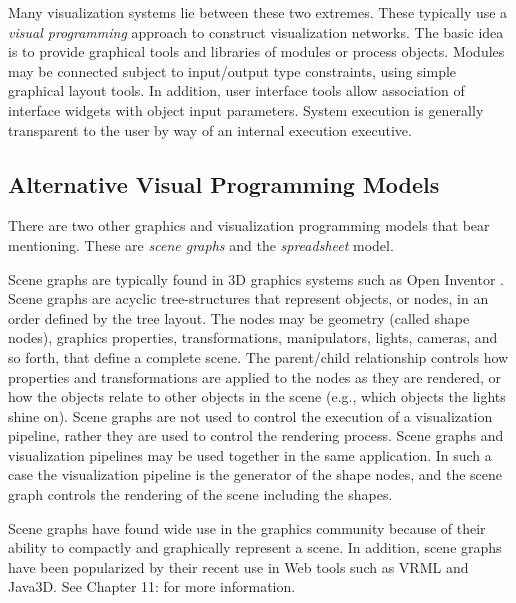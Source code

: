 Many visualization systems lie between these two extremes. These typically use a \emph{visual programming} approach to construct visualization networks. The basic idea is to provide graphical tools and libraries of modules or process objects. Modules may be connected subject to input/output type constraints, using simple graphical layout tools. In addition, user interface tools allow association of interface widgets with object input parameters. System execution is generally transparent to the user by way of an internal execution executive.

\subsection{Alternative Visual Programming Models}
\label{subsec:alternative_visual_programming_models}

There are two other graphics and visualization programming models that bear mentioning. These are \emph{scene graphs} and the \emph{spreadsheet} model. 

Scene graphs are typically found in 3D graphics systems such as Open Inventor \cite{Wernecke94}. Scene graphs are acyclic tree-structures that represent objects, or nodes, in an order defined by the tree layout. The nodes may be geometry (called shape nodes), graphics properties, transformations, manipulators, lights, cameras, and so forth, that define a complete scene. The parent/child relationship controls how properties and transformations are applied to the nodes as they are rendered, or how the objects relate to other objects in the scene (e.g., which objects the lights shine on). Scene graphs are not used to control the execution of a visualization pipeline, rather they are used to control the rendering process. Scene graphs and visualization pipelines may be used together in the same application. In such a case the visualization pipeline is the generator of the shape nodes, and the scene graph controls the rendering of the scene including the shapes.

Scene graphs have found wide use in the graphics community because of their ability to compactly and graphically represent a scene. In addition, scene graphs have been popularized by their recent use in Web tools such as VRML and Java3D. See Chapter 11:  for more information.

